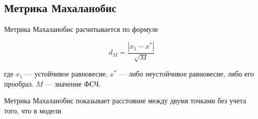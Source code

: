 \subsection{Метрика Махаланобис}
        

    Метрика Махаланобис расчитывается по формуле 

    \[d_M = \frac{|x_1 - x^*|}{\sqrt{M}}\]
        
    где \(x_1\) --- устойчивое равновесие, \(x^*\) --- либо неустойчивое равновесие, либо его прообраз. \(M\) --- значение ФСЧ.

    Метрика Махаланобис показывает расстояние между двумя точками без учета того, что в модели 

